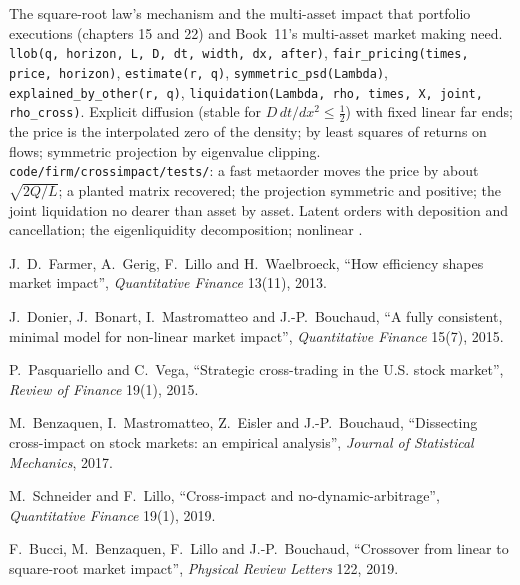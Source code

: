 \begin{build}
 The square-root law's mechanism and the multi-asset impact that portfolio executions (chapters 15 and 22) and Book~11's multi-asset
market making need.
 \texttt{llob(q, horizon, L, D, dt, width, dx, after)}, \texttt{fair\_pricing(times, price, horizon)}, \texttt{estimate(r, q)},
\texttt{symmetric\_psd(Lambda)}, \texttt{explained\_by\_other(r, q)}, \texttt{liquidation(Lambda, rho, times, X, joint, rho\_cross)}.
 Explicit diffusion (stable for $D\,dt/dx^2\le\tfrac12$) with fixed linear far ends; the price is the interpolated zero of the density;
 by least squares of returns on flows; symmetric projection by eigenvalue clipping.
 \texttt{code/firm/crossimpact/tests/}: a fast metaorder moves the price by about $\sqrt{2Q/L}$; a planted matrix recovered;
the projection symmetric and positive; the joint liquidation no dearer than asset by asset.
 Latent orders with deposition and cancellation; the eigenliquidity decomposition; nonlinear .
\end{build}

\begin{omsources}
\item J.~D.~Farmer, A.~Gerig, F.~Lillo and H.~Waelbroeck, ``How efficiency shapes market impact'', \emph{Quantitative Finance} 13(11), 2013.
\item J.~Donier, J.~Bonart, I.~Mastromatteo and J.-P.~Bouchaud, ``A fully consistent, minimal model for non-linear market impact'', \emph{Quantitative
Finance} 15(7), 2015.
\item P.~Pasquariello and C.~Vega, ``Strategic cross-trading in the U.S. stock market'', \emph{Review of Finance} 19(1), 2015.
\item M.~Benzaquen, I.~Mastromatteo, Z.~Eisler and J.-P.~Bouchaud, ``Dissecting cross-impact on stock markets: an empirical analysis'', \emph{Journal of
Statistical Mechanics}, 2017.
\item M.~Schneider and F.~Lillo, ``Cross-impact and no-dynamic-arbitrage'', \emph{Quantitative Finance} 19(1), 2019.
\item F.~Bucci, M.~Benzaquen, F.~Lillo and J.-P.~Bouchaud, ``Crossover from linear to square-root market impact'', \emph{Physical Review Letters} 122, 2019.
\end{omsources}

